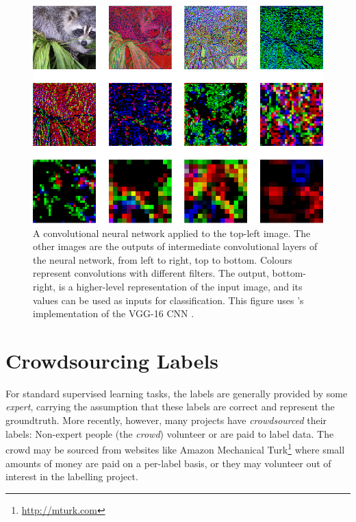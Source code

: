        \begin{figure}[!ht]
            \centering
            \includegraphics[width=\textwidth]{images/face_cnn.png}
            \caption{A convolutional neural network applied to the top-left
                image. The other images are the outputs of intermediate
                convolutional layers of the neural network, from left to right,
                top to bottom. Colours represent convolutions with different
                filters. The output, bottom-right, is a higher-level
                representation of the input image, and its values can be used
                as inputs for classification. This figure uses
                \citeauthor{baraldi15}'s implementation of the VGG-16 CNN
                \citep{simoyan14}.}
            \label{fig:face-cnn}
        \end{figure}

\section{Crowdsourcing Labels}
\label{sec:crowdsourcing}

    For standard supervised learning tasks, the labels are generally provided by
    some \emph{expert}, carrying the assumption that these labels are correct
    and represent the groundtruth. More recently, however, many projects have
    \emph{crowdsourced} their labels: Non-expert people (the \emph{crowd})
    volunteer or are paid to label data. The crowd may be sourced from websites
    like Amazon Mechanical Turk\footnote{\url{http://mturk.com}} where small
    amounts of money are paid on a per-label basis, or they may volunteer out of
    interest in the labelling project.

